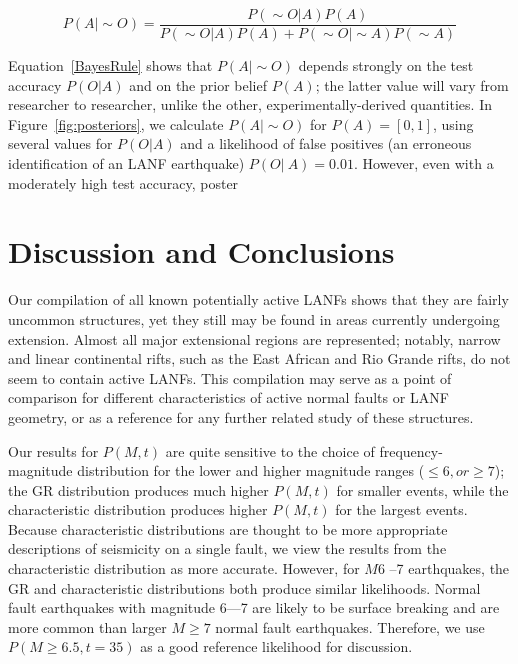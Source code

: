 \documentclass[twocolumn,grl]{AGUTeX}
\begin{document}
\begin{article}
\begin{equation}
P(A | \sim O) = \frac{P(\sim O|A) P(A)}
{P(\sim O|A)P(A) + P(\sim O|\sim A)P(\sim A)}
\label{BayesRule}
\end{equation}

Equation~\ref{BayesRule} shows that $P(A|\sim O)$
depends strongly on the test accuracy $P(O|A)$ and on the
prior belief $P(A)$; the latter value will vary from
researcher to researcher, unlike the other, experimentally-derived quantities.
In Figure~\ref{fig:posteriors}, we calculate $P(A|\sim O)$ for $P(A) = [0,1]$,
using several values for $P(O|A)$ and a likelihood of false positives 
(an erroneous identification of an LANF earthquake) $P(O|~A)= 0.01$. However,
even with a moderately high test accuracy, poster


\section{Discussion and Conclusions}

Our compilation of all known potentially active LANFs shows that they 
are fairly uncommon structures, yet they still may be found in areas 
currently undergoing extension. Almost all major extensional regions are
represented; notably, narrow and linear continental rifts, such as 
the East African and Rio Grande rifts, do not seem to contain active LANFs.
This compilation may serve as a point of comparison for different
characteristics of active normal faults or LANF geometry, or as a
reference for any further related study of these structures.

Our results for $P(M,t)$ are quite sensitive to the choice of 
 frequency- magnitude distribution for the lower and higher magnitude ranges ($\le 6, or
\ge 7$); the GR distribution produces much higher $P(M,t)$ for smaller events,
while the characteristic distribution produces higher $P(M,t)$ for the largest
events.  Because characteristic distributions are thought to be more
appropriate descriptions of seismicity on a single fault, we view the results
from the characteristic distribution as more accurate.
However, for $M6$ --7 earthquakes, the GR and characteristic 
distributions both produce similar likelihoods. Normal fault earthquakes with magnitude 6—7 are likely to be surface breaking and are more common than larger $M \ge 7$ normal fault earthquakes.  Therefore, we use $P(M\ge6.5, t=35)$ as a good reference
likelihood for discussion.


\end{article}
\end{document}
